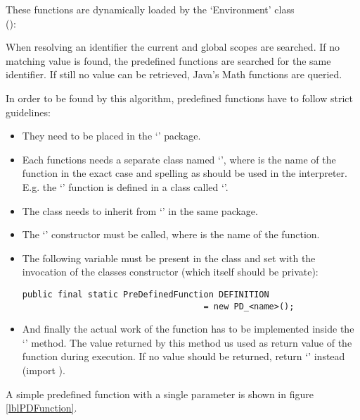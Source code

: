 These functions are dynamically loaded by the `Environment' class\\ ():

When resolving an identifier the current and global scopes are searched. If no matching value is found, the predefined functions are searched for the same identifier. If still no value can be retrieved, Java's Math functions are queried.

In order to be found by this algorithm, predefined functions have to follow strict guidelines:

\begin{itemize}
	\item They need to be placed in the `' package.
	\item Each functions needs a separate class named `', where  is the name of the function in the exact case and spelling as should be used in the interpreter.\\
		E.g. the `' function is defined in a class called `'.
	\item The class needs to inherit from `' in the same package.
	\item The `' constructor must be called, where  is the name of the function.
	\item The following variable must be present in the class and set with the invocation of the classes constructor (which itself should be private):
\begin{lstlisting}[frame=none,numbers=none]
public final static PreDefinedFunction DEFINITION
                                    = new PD_<name>();
\end{lstlisting}
	\item And finally the actual work of the function has to be implemented inside the `' method. The value returned by this method us used as return value of the function during execution. If no value should be returned, return `' instead (import ).

\end{itemize}

A simple predefined function with a single parameter is shown in figure \ref{lblPDFunction}.


